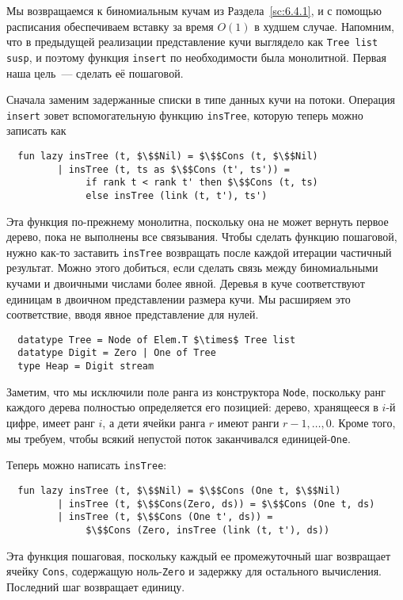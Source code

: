 Мы возвращаемся к биномиальным кучам из Раздела~\ref{sc:6.4.1}, и с
помощью расписания обеспечиваем вставку за время $O(1)$ в худшем
случае. Напомним, что в предыдущей реализации представление кучи
выглядело как \lstinline!Tree list susp!, и поэтому функция \lstinline!insert!
по необходимости была монолитной. Первая наша цель~--- сделать её
пошаговой.

Сначала заменим задержанные списки в типе данных кучи на
потоки. Операция \lstinline!insert! зовет вспомогательную функцию
\lstinline!insTree!, которую теперь можно записать как
\begin{lstlisting}
  fun lazy insTree (t, $\$$Nil) = $\$$Cons (t, $\$$Nil)
         | insTree (t, ts as $\$$Cons (t', ts')) =
              if rank t < rank t' then $\$$Cons (t, ts)
              else insTree (link (t, t'), ts')
\end{lstlisting}
Эта функция по-прежнему монолитна, поскольку она не может вернуть
первое дерево, пока не выполнены все связывания. Чтобы сделать функцию
пошаговой, нужно как-то заставить \lstinline!insTree! возвращать после
каждой итерации частичный результат. Можно этого добиться, если
сделать связь между биномиальными кучами и двоичными числами более
явной. Деревья в куче соответствуют единицам в двоичном представлении
размера кучи. Мы расширяем это соответствие, вводя явное представление
для нулей.
\begin{lstlisting}
  datatype Tree = Node of Elem.T $\times$ Tree list
  datatype Digit = Zero | One of Tree
  type Heap = Digit stream
\end{lstlisting}
Заметим, что мы исключили поле ранга из конструктора \lstinline!Node!,
поскольку ранг каждого дерева полностью определяется его позицией:
дерево, хранящееся в $i$-й цифре, имеет ранг $i$, а дети ячейки ранга
$r$ имеют ранги $r - 1,\ldots, 0$. Кроме того, мы требуем, чтобы
всякий непустой поток заканчивался единицей-\lstinline!One!.

Теперь можно написать \lstinline!insTree!:
\begin{lstlisting}
  fun lazy insTree (t, $\$$Nil) = $\$$Cons (One t, $\$$Nil)
         | insTree (t, $\$$Cons(Zero, ds)) = $\$$Cons (One t, ds)
         | insTree (t, $\$$Cons (One t', ds)) =
              $\$$Cons (Zero, insTree (link (t, t'), ds))
\end{lstlisting}
Эта функция пошаговая, поскольку каждый ее промежуточный шаг
возвращает ячейку \lstinline!Cons!, содержащую ноль-\lstinline!Zero! и
задержку для остального 
вычисления. Последний шаг возвращает единицу.

